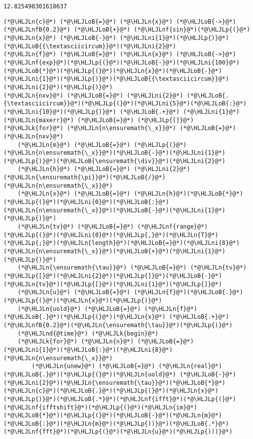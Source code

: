 \documentclass[12pt,a4paper]{article}
\newcommand{\HLJLk}[1]{\textcolor[RGB]{148,91,176}{\textbf{#1}}}
\newcommand{\HLJLn}[1]{#1}
\newcommand{\HLJLnd}[1]{\textcolor[RGB]{214,102,97}{#1}}
\newcommand{\HLJLnf}[1]{\textcolor[RGB]{66,102,213}{#1}}
\newcommand{\HLJLnfB}[1]{\textcolor[RGB]{59,151,46}{#1}}
\newcommand{\HLJLni}[1]{\textcolor[RGB]{59,151,46}{#1}}
\newcommand{\HLJLoB}[1]{\textcolor[RGB]{102,102,102}{\textbf{#1}}}
\newcommand{\HLJLp}[1]{#1}
\begin{document}
\begin{lstlisting}
12.825498301618637
\end{lstlisting}


\begin{lstlisting}
(*@\HLJLn{c}@*) (*@\HLJLoB{=}@*) (*@\HLJLn{x}@*) (*@\HLJLoB{->}@*) (*@\HLJLnfB{0.2}@*) (*@\HLJLoB{+}@*) (*@\HLJLnf{sin}@*)(*@\HLJLp{(}@*)(*@\HLJLn{x}@*) (*@\HLJLoB{-}@*) (*@\HLJLni{1}@*)(*@\HLJLp{)}@*)(*@\HLJLoB{{\textasciicircum}}@*)(*@\HLJLni{2}@*)
(*@\HLJLn{f}@*) (*@\HLJLoB{=}@*) (*@\HLJLn{x}@*) (*@\HLJLoB{->}@*) (*@\HLJLnf{exp}@*)(*@\HLJLp{(}@*)(*@\HLJLoB{-}@*)(*@\HLJLni{100}@*)(*@\HLJLoB{*}@*)(*@\HLJLp{(}@*)(*@\HLJLn{x}@*)(*@\HLJLoB{-}@*)(*@\HLJLni{1}@*)(*@\HLJLp{)}@*)(*@\HLJLoB{{\textasciicircum}}@*)(*@\HLJLni{2}@*)(*@\HLJLp{)}@*)
(*@\HLJLn{nxv}@*) (*@\HLJLoB{=}@*) (*@\HLJLni{2}@*) (*@\HLJLoB{.{\textasciicircum}}@*)(*@\HLJLp{(}@*)(*@\HLJLni{5}@*)(*@\HLJLoB{:}@*)(*@\HLJLni{10}@*)(*@\HLJLp{)}@*) (*@\HLJLoB{.+}@*) (*@\HLJLni{1}@*)
(*@\HLJLn{maxerr}@*) (*@\HLJLoB{=}@*) (*@\HLJLp{[]}@*)
(*@\HLJLk{for}@*) (*@\HLJLn{n\ensuremath{\_x}}@*) (*@\HLJLoB{=}@*) (*@\HLJLn{nxv}@*) 
    (*@\HLJLn{m}@*) (*@\HLJLoB{=}@*) (*@\HLJLp{(}@*)(*@\HLJLn{n\ensuremath{\_x}}@*)(*@\HLJLoB{-}@*)(*@\HLJLni{1}@*)(*@\HLJLp{)}@*)(*@\HLJLoB{\ensuremath{\div}}@*)(*@\HLJLni{2}@*)
    (*@\HLJLn{h}@*) (*@\HLJLoB{=}@*) (*@\HLJLni{2}@*)(*@\HLJLn{\ensuremath{\pi}}@*)(*@\HLJLoB{/}@*)(*@\HLJLn{n\ensuremath{\_x}}@*)
    (*@\HLJLn{x}@*) (*@\HLJLoB{=}@*) (*@\HLJLn{h}@*)(*@\HLJLoB{*}@*)(*@\HLJLp{(}@*)(*@\HLJLni{0}@*)(*@\HLJLoB{:}@*)(*@\HLJLn{n\ensuremath{\_x}}@*)(*@\HLJLoB{-}@*)(*@\HLJLni{1}@*)(*@\HLJLp{)}@*)
    (*@\HLJLn{tv}@*) (*@\HLJLoB{=}@*) (*@\HLJLnf{range}@*)(*@\HLJLp{(}@*)(*@\HLJLni{0}@*)(*@\HLJLp{,}@*)(*@\HLJLn{T}@*)(*@\HLJLp{;}@*)(*@\HLJLn{length}@*)(*@\HLJLoB{=}@*)(*@\HLJLni{8}@*)(*@\HLJLn{n\ensuremath{\_x}}@*)(*@\HLJLoB{+}@*)(*@\HLJLni{1}@*)(*@\HLJLp{)}@*)
    (*@\HLJLn{\ensuremath{\tau}}@*) (*@\HLJLoB{=}@*) (*@\HLJLn{tv}@*)(*@\HLJLp{[}@*)(*@\HLJLni{2}@*)(*@\HLJLp{]}@*)(*@\HLJLoB{-}@*)(*@\HLJLn{tv}@*)(*@\HLJLp{[}@*)(*@\HLJLni{1}@*)(*@\HLJLp{]}@*)
    (*@\HLJLn{u}@*) (*@\HLJLoB{=}@*) (*@\HLJLn{f}@*)(*@\HLJLoB{.}@*)(*@\HLJLp{(}@*)(*@\HLJLn{x}@*)(*@\HLJLp{)}@*)
    (*@\HLJLn{uold}@*) (*@\HLJLoB{=}@*) (*@\HLJLn{f}@*)(*@\HLJLoB{.}@*)(*@\HLJLp{(}@*)(*@\HLJLn{x}@*) (*@\HLJLoB{.+}@*) (*@\HLJLnfB{0.2}@*)(*@\HLJLn{\ensuremath{\tau}}@*)(*@\HLJLp{)}@*)
    (*@\HLJLnd{@time}@*) (*@\HLJLk{begin}@*)
    (*@\HLJLk{for}@*) (*@\HLJLn{n}@*) (*@\HLJLoB{=}@*) (*@\HLJLni{1}@*)(*@\HLJLoB{:}@*)(*@\HLJLni{8}@*)(*@\HLJLn{n\ensuremath{\_x}}@*)
        (*@\HLJLn{unew}@*) (*@\HLJLoB{=}@*) (*@\HLJLn{real}@*)(*@\HLJLoB{.}@*)(*@\HLJLp{(}@*)(*@\HLJLn{uold}@*) (*@\HLJLoB{-}@*) (*@\HLJLni{2}@*)(*@\HLJLn{\ensuremath{\tau}}@*)(*@\HLJLoB{*}@*)(*@\HLJLn{c}@*)(*@\HLJLoB{.}@*)(*@\HLJLp{(}@*)(*@\HLJLn{x}@*)(*@\HLJLp{)}@*)(*@\HLJLoB{.*}@*)(*@\HLJLnf{ifft}@*)(*@\HLJLp{(}@*)(*@\HLJLnf{ifftshift}@*)(*@\HLJLp{(}@*)(*@\HLJLn{im}@*)(*@\HLJLoB{*}@*)(*@\HLJLp{(}@*)(*@\HLJLoB{-}@*)(*@\HLJLn{m}@*)(*@\HLJLoB{:}@*)(*@\HLJLn{m}@*)(*@\HLJLp{))}@*)(*@\HLJLoB{.*}@*)(*@\HLJLnf{fft}@*)(*@\HLJLp{(}@*)(*@\HLJLn{u}@*)(*@\HLJLp{)))}@*)

\end{lstlisting}
\end{document}
